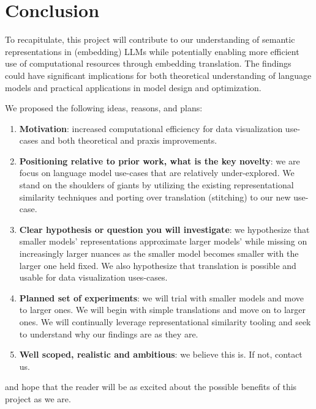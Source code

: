 \documentclass[9pt,letterpaper]{article}
\begin{document}
\section*{Conclusion}

To recapitulate, this project will contribute to our understanding of semantic representations in (embedding) LLMs while potentially enabling more efficient use of computational resources through embedding translation. The findings could have significant implications for both theoretical understanding of language models and practical applications in model design and optimization.

We proposed the following ideas, reasons, and plans:
\begin{enumerate}
    \item \textbf{Motivation}: increased computational efficiency for data visualization use-cases and both theoretical and praxis improvements.
    \item \textbf{Positioning relative to prior work, what is the key novelty}: we are focus on language model use-cases that are relatively under-explored. We stand on the shoulders of giants by utilizing the existing representational similarity techniques and porting over translation (stitching) to our new use-case.
    \item \textbf{Clear hypothesis or question you will investigate}: we hypothesize that smaller models' representations approximate larger models' while missing on increasingly larger nuances as the smaller model becomes smaller with the larger one held fixed. We also hypothesize that translation is possible and usable for data visualization uses-cases.
    \item \textbf{Planned set of experiments}: we will trial with smaller models and move to larger ones. We will begin with simple translations and move on to larger ones. We will continually leverage representational similarity tooling and seek to understand why our findings are as they are.
    \item \textbf{Well scoped, realistic and ambitious}: we believe this is. If not, contact us.
\end{enumerate}
and hope that the reader will be as excited about the possible benefits of this project as we are.

\end{document}
